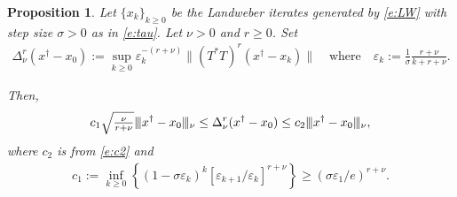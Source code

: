 \documentclass[10pt, a4paper]{iopart}
\newcommand{\norm}[2]{     \| #1       \|_{ #2 }}
\newcommand{\normiii}[2]{\vert\kern-0.25ex\vert\kern-0.25ex\vert #1 \vert\kern-0.25ex \vert\kern-0.25ex\vert_{ #2 }}
\newtheorem{proposition}[lemma]{Proposition}
\theoremstyle{remark}
\theoremstyle{definition}
\begin{document}
\begin{proposition}
\label{p:LW}
	Let $\{ x_k \}_{k \geq 0}$ be the Landweber iterates 
	generated by \eqref{e:LW}
	with 
	step size $\sigma > 0$ as in \eqref{e:tau}.
	Let $\nu > 0$ and $r \geq 0$.
	Set
	\begin{align}
	\label{e:LWE}
		\Delta_{\nu}^r(x^\dag - x_0)
		:=
		\sup_{k \geq 0}
		\varepsilon_{k}^{-(r + \nu)}
		\norm{ (T^* T)^r (x^\dag - x_k) }{}
		\quad\text{where}\quad
		\varepsilon_{k}
		:=
		\frac{1}{\sigma}
		\frac{r + \nu}{k + r + \nu}
		.
	\end{align}

	Then, 
	\begin{align}
	\label{e:p:LW}
		c_1
		\sqrt{ \tfrac{\nu}{r + \nu} }
		\normiii{x^\dag - x_0}{\nu}
	\leq
		\Delta_{\nu}^r(x^\dag - x_0)
	\leq
		c_2
		\normiii{x^\dag - x_0}{\nu}
		,
	\end{align}
	where $c_2$ is from \eqref{e:c2} and
	\begin{align}
	\label{e:p:LW:c1}
		c_1
		:=
		\inf_{k \geq 0}
		\left\{
			(1 - \sigma \varepsilon_{k})^{k}
			\left[
				\varepsilon_{k+1} / \varepsilon_{k}
			\right]^{r + \nu}
		\right\}
		\geq
		( \sigma \varepsilon_1 / e)^{r + \nu}
		.
	\end{align}
\end{proposition}

\end{document}
